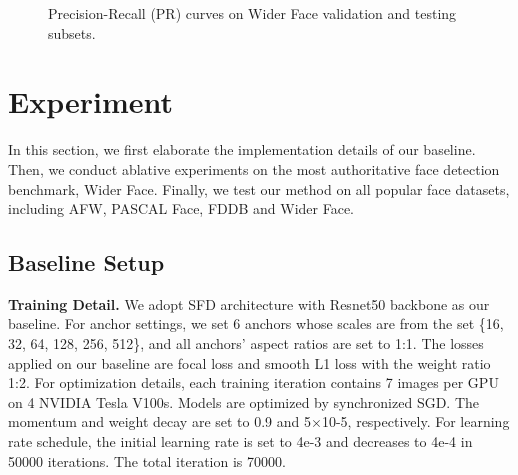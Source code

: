 \documentclass[10pt,twocolumn,letterpaper]{article}
\begin{document}
\begin{figure*}[t]
    \centering
    \hspace{0.3in}
    
    \hspace{0.3in}
    \caption{Precision-Recall (PR) curves on Wider Face validation and testing subsets.}
    \label{img_5}
    \vspace{-2mm}
\end{figure*}

\section{Experiment}
\label{sec:experiment}
In this section, we first elaborate the implementation details of our baseline. Then, we conduct ablative experiments on the most authoritative face detection benchmark, Wider Face. Finally, we test our method on all popular face datasets, including AFW, PASCAL Face, FDDB and Wider Face. 

\subsection{Baseline Setup}
\noindent\textbf{Training Detail.} 
 We adopt SFD \cite{zhang2017s3fd} architecture with Resnet50 \cite{he2016deep} backbone as our baseline. For anchor settings,  we set 6 anchors whose scales are from the set \{16, 32, 64, 128, 256, 512\}, and all anchors’ aspect ratios are set to 1:1. The losses applied on our baseline are focal loss and smooth L1 loss with the weight ratio 1:2. 
 For optimization details, each training iteration contains 7 images per GPU on 4 NVIDIA Tesla V100s. Models are optimized by synchronized SGD. The momentum and weight decay are set to 0.9 and 5$\times$10-5, respectively. For learning rate schedule, the initial learning rate is set to 4e-3 and decreases to 4e-4 in 50000 iterations. The total iteration is 70000. 
 
\end{document}

